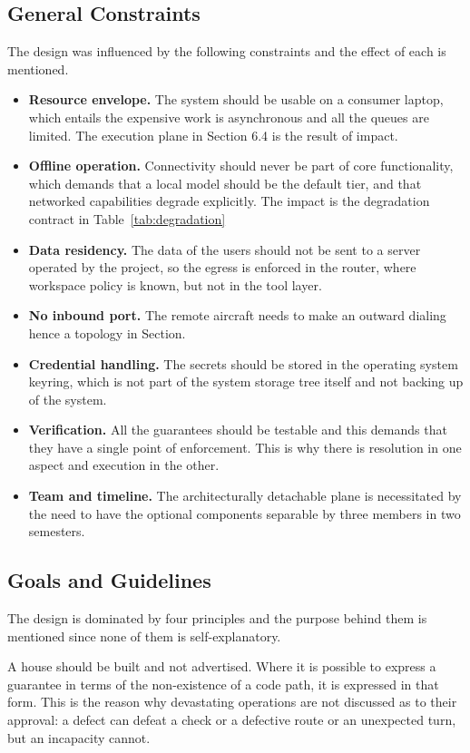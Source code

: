 \documentclass{FastFyp}
\begin{document}
\subsection{General Constraints}
The design was influenced by the following constraints and the effect of each is mentioned.

\begin{itemize}
    \item \textbf{Resource envelope.} The system should be usable on a consumer laptop, which entails the expensive work is asynchronous and all the queues are limited. The execution plane in Section 6.4 is the result of impact.
    \item \textbf{Offline operation.} Connectivity should never be part of core functionality, which demands that a local model should be the default tier, and that networked capabilities degrade explicitly. The impact is the degradation contract in Table~\ref{tab:degradation}
    \item \textbf{Data residency.} The data of the users should not be sent to a server operated by the project, so the egress is enforced in the router, where workspace policy is known, but not in the tool layer.
    \item \textbf{No inbound port.} The remote aircraft needs to make an outward dialing hence a topology in Section.
    \item \textbf{Credential handling.} The secrets should be stored in the operating system keyring, which is not part of the system storage tree itself and not backing up of the system.
    \item \textbf{Verification.} All the guarantees should be testable and this demands that they have a single point of enforcement. This is why there is resolution in one aspect and execution in the other.
    \item \textbf{Team and timeline.} The architecturally detachable plane is necessitated by the need to have the optional components separable by three members in two semesters.
\end{itemize}

\subsection{Goals and Guidelines}
The design is dominated by four principles and the purpose behind them is mentioned since none of them is self-explanatory.

A house should be built and not advertised. Where it is possible to express a guarantee in terms of the non-existence of a code path, it is expressed in that form. This is the reason why devastating operations are not discussed as to their approval: a defect can defeat a check or a defective route or an unexpected turn, but an incapacity cannot.
\end{document}
